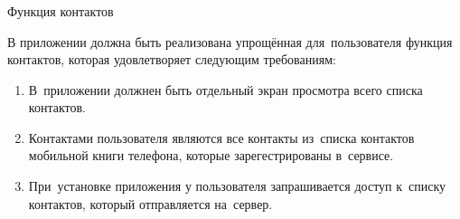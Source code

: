\subsubsection{} Функция контактов
\label{sec:analysis:research:funcreq:contacts}

В приложении должна быть реализована упрощённая для~пользователя функция контактов, которая удовлетворяет следующим требованиям:

\begin{enumerate}
	\item В~приложении должнен быть отдельный экран просмотра всего списка контактов.
	\item Контактами пользователя являются все контакты из~списка контактов мобильной книги телефона, которые зарегестрированы в~сервисе.
	\item При~установке приложения у пользователя запрашивается доступ к~списку контактов, который отправляется на~сервер.
\end{enumerate}